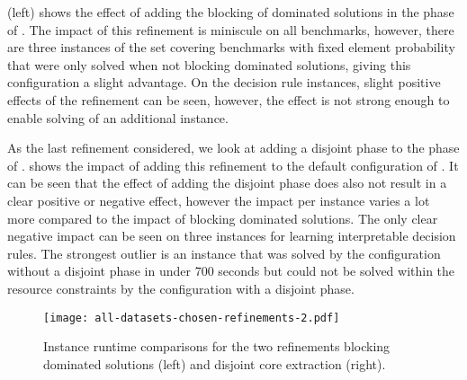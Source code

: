  (left) shows the effect of adding the blocking of dominated solutions in the \satunsat{} phase of \msh{}.
The impact of this refinement is miniscule on all benchmarks, however, there are three instances of the set covering benchmarks with fixed element probability that were only solved when not blocking dominated solutions, giving this configuration a slight advantage.
On the decision rule instances, slight positive effects of the refinement can be seen, however, the effect is not strong enough to enable solving of an additional instance.

As the last refinement considered, we look at adding a disjoint phase to the \msu{} phase of \msh{}.
 shows the impact of adding this refinement to the default configuration of \msh{}.
It can be seen that the effect of adding the disjoint phase does also not result in a clear positive or negative effect, however the impact per instance varies a lot more compared to the impact of blocking dominated solutions.
The only clear negative impact can be seen on three instances for learning interpretable decision rules.
The strongest outlier is an instance that was solved by the configuration without a disjoint phase in under 700 seconds but could not be solved within the resource constraints by the configuration with a disjoint phase.

\begin{figure}
    \centering
    \texttt{[image: all-datasets-chosen-refinements-2.pdf]}
    \caption{Instance runtime comparisons for the two refinements blocking dominated solutions (left) and disjoint core extraction (right). }\label{fig:refinements-2}
\end{figure}